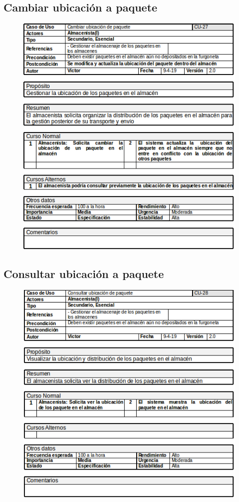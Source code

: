 \subsection{Cambiar ubicación a paquete}
\begin{figure}[H]
	\centering
	\includegraphics[width=16cm]{27}
\end{figure}
\subsection{Consultar ubicación a paquete}
\begin{figure}[H]
	\centering
	\includegraphics[width=16cm]{28}
\end{figure}
